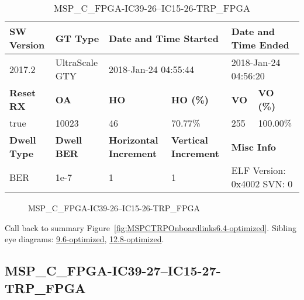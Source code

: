 \begin{table}[h]
\centering
\caption{MSP\_C\_FPGA-IC39-26--IC15-26-TRP\_FPGA}
\label{tab:MSPCFPGAIC3926IC1526TRPFPGA6.4-optimized}
\begin{tabular}{@{}|l|l|l|l|l|l|@{}}
\toprule
\textbf{SW Version}                & \textbf{GT Type}   & \multicolumn{2}{l|}{\textbf{Date and Time Started}}            & \multicolumn{2}{l|}{\textbf{Date and Time Ended}}        \\ \midrule
2017.2                       & UltraScale GTY          & \multicolumn{2}{l|}{2018-Jan-24 04:55:44}                   & \multicolumn{2}{l|}{2018-Jan-24 04:56:20}               \\ \midrule
\textbf{Reset RX}                  & \textbf{OA} & \textbf{HO}   & \textbf{HO (\%)} & \textbf{VO} & \textbf{VO (\%)} \\ \midrule
true & 10023        & 46          & 70.77\%        & 255        & 100.00\%       \\ \midrule
\textbf{Dwell Type}                & \textbf{Dwell BER} & \textbf{Horizontal Increment} & \textbf{Vertical Increment}    & \multicolumn{2}{l|}{\textbf{Misc Info}}                  \\ \midrule
BER                            & 1e-7        & 1        & 1           & \multicolumn{2}{l|}{ELF Version: 0x4002 SVN: 0}                         \\ \bottomrule
\end{tabular}
\end{table}

\begin{figure}[h]
\caption{MSP\_C\_FPGA-IC39-26--IC15-26-TRP\_FPGA} \label{fig:MSPCFPGAIC3926IC1526TRPFPGA6.4-optimized}
\end{figure}

Call back to summary Figure~\ref{fig:MSPCTRPOnboardlinks6.4-optimized}.
Sibling eye diagrams: \hyperref[sec:MSPCFPGAIC3926IC1526TRPFPGA9.6-optimized]{9.6-optimized}, \hyperref[sec:MSPCFPGAIC3926IC1526TRPFPGA12.8-optimized]{12.8-optimized}.

\clearpage
\newpage


\subsection{MSP\_C\_FPGA-IC39-27--IC15-27-TRP\_FPGA}\label{sec:MSPCFPGAIC3927IC1527TRPFPGA6.4-optimized}

